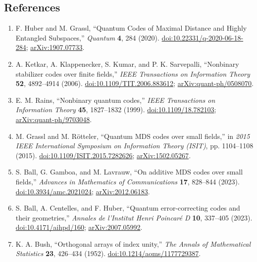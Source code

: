\subsection*{References}

\begin{enumerate}[label={},leftmargin=4.8em,labelsep=0.5em]
  \footnotesize
  \item[\textup{[HG20]}]\label{ref:qmds-huber-grassl}
  F. Huber and M. Grassl,
  ``Quantum Codes of Maximal Distance and Highly Entangled Subspaces,''
  \emph{Quantum} \textbf{4}, 284 (2020).
  \href{https://doi.org/10.22331/q-2020-06-18-284}{doi:10.22331/q-2020-06-18-284};
  \href{https://arxiv.org/abs/1907.07733}{arXiv:1907.07733}.

  \item[\textup{[KKKS06]}]\label{ref:qmds-ketkar}
  A. Ketkar, A. Klappenecker, S. Kumar, and P. K. Sarvepalli, ``Nonbinary
stabilizer codes over finite fields,'' \emph{IEEE Transactions on
Information Theory} \textbf{52}, 4892--4914 (2006).
\href{https://doi.org/10.1109/TIT.2006.883612}{doi:10.1109/TIT.2006.883612};
\href{https://arxiv.org/abs/quant-ph/0508070}{arXiv:quant-ph/0508070}.

  \item[\textup{[Rai99]}]\label{ref:qmds-rains}
  E. M. Rains, ``Nonbinary quantum codes,'' \emph{IEEE Transactions on
Information Theory} \textbf{45}, 1827--1832 (1999).
\href{https://doi.org/10.1109/18.782103}{doi:10.1109/18.782103};
\href{https://arxiv.org/abs/quant-ph/9703048}{arXiv:quant-ph/9703048}.

  \item[\textup{[GR15]}]\label{ref:qmds-grassl-roetteler}
  M. Grassl and M. R\"otteler, ``Quantum MDS codes over small fields,'' in
\emph{2015 IEEE International Symposium on Information Theory (ISIT)},
pp. 1104--1108 (2015).
\href{https://doi.org/10.1109/ISIT.2015.7282626}{doi:10.1109/ISIT.2015.7282626};
\href{https://arxiv.org/abs/1502.05267}{arXiv:1502.05267}.

  \item[\textup{[BGL23]}]\label{ref:qmds-ball-gamboa-lavrauw}
  S. Ball, G. Gamboa, and M. Lavrauw, ``On additive MDS codes over small
fields,'' \emph{Advances in Mathematics of Communications} \textbf{17},
828--844 (2023).
\href{https://doi.org/10.3934/amc.2021024}{doi:10.3934/amc.2021024};
\href{https://arxiv.org/abs/2012.06183}{arXiv:2012.06183}.

  \item[\textup{[BCH23]}]\label{ref:qmds-ball-centelles-huber}
  S. Ball, A. Centelles, and F. Huber, ``Quantum error-correcting codes and
their geometries,'' \emph{Annales de l'Institut Henri Poincar\'e D}
\textbf{10}, 337--405 (2023).
\href{https://doi.org/10.4171/aihpd/160}{doi:10.4171/aihpd/160};
\href{https://arxiv.org/abs/2007.05992}{arXiv:2007.05992}.

  \item[\textup{[Bus52]}]\label{ref:qmds-bush}
  K. A. Bush, ``Orthogonal arrays of index unity,'' \emph{The Annals of
Mathematical Statistics} \textbf{23}, 426--434 (1952).
\href{https://doi.org/10.1214/aoms/1177729387}{doi:10.1214/aoms/1177729387}.
\end{enumerate}

